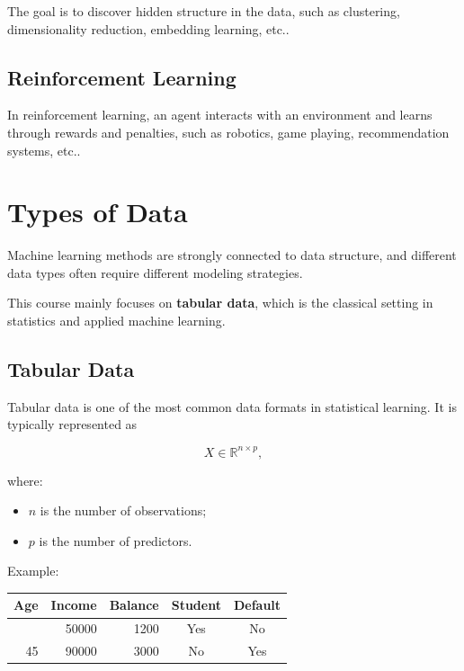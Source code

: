 \documentclass[
  letterpaper,
  DIV=11,
  numbers=noendperiod]{scrreprt}
\newcounter{none} %
\providecommand{\tightlist}{%
  \setlength{\itemsep}{0pt}\setlength{\parskip}{0pt}}
\theoremstyle{definition}
\theoremstyle{definition}
\theoremstyle{plain}
\theoremstyle{plain}
\theoremstyle{remark}
\begin{document}
The goal is to discover hidden structure in the data, such as
clustering, dimensionality reduction, embedding learning, etc..

\subsection{Reinforcement Learning}\label{reinforcement-learning}

In reinforcement learning, an agent interacts with an environment and
learns through rewards and penalties, such as robotics, game playing,
recommendation systems, etc..

\section{Types of Data}\label{types-of-data}

Machine learning methods are strongly connected to data structure, and
different data types often require different modeling strategies.

This course mainly focuses on \textbf{tabular data}, which is the
classical setting in statistics and applied machine learning.

\subsection{Tabular Data}\label{tabular-data}

Tabular data is one of the most common data formats in statistical
learning. It is typically represented as

\[
X \in \mathbb{R}^{n \times p},
\]

where:

\begin{itemize}
\tightlist
\item
  \(n\) is the number of observations;
\item
  \(p\) is the number of predictors.
\end{itemize}

Example:

{\def\LTcaptype{none} %
\begin{longtable}[]{@{}rrrcc@{}}
\toprule\noalign{}
Age & Income & Balance & Student & Default \\
\midrule\noalign{}
\endhead
\bottomrule\noalign{}
\endlastfoot
23 & 50000 & 1200 & Yes & No \\
45 & 90000 & 3000 & No & Yes \\
\end{longtable}
}
\end{document}
